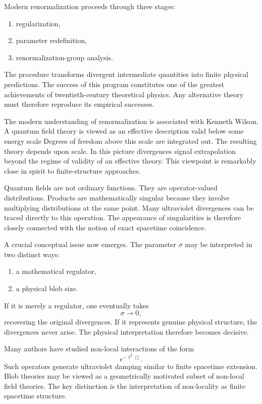 Modern renormalization proceeds through three stages:
\begin{enumerate}
\item regularization,
\item parameter redefinition,
\item renormalization-group analysis.
\end{enumerate}
The procedure transforms divergent intermediate quantities into finite physical predictions.
The success of this program constitutes one of the greatest achievements of twentieth-century theoretical physics.
Any alternative theory must therefore reproduce its empirical successes.

The modern understanding of renormalization is associated with
Kenneth Wilson.
A quantum field theory is viewed as an effective description valid below some energy scale
Degrees of freedom above this scale are integrated out.
The resulting theory depends upon scale.
In this picture divergences signal extrapolation beyond the regime of validity of an effective theory.
This viewpoint is remarkably close in spirit to finite-structure approaches.

Quantum fields are not ordinary functions.
They are operator-valued distributions.
Products 
are mathematically singular because they involve multiplying distributions at the same point.
Many ultraviolet divergences can be traced directly to this operation.
The appearance of singularities is therefore closely connected with the notion of exact spacetime coincidence.

A crucial conceptual issue now emerges.
The parameter $\sigma $
may be interpreted in two distinct ways:
\begin{enumerate}
\item a mathematical regulator,
\item a physical blob size.
\end{enumerate}
If it is merely a regulator, one eventually takes
\[
\sigma\rightarrow 0,
\]
recovering the original divergences.
If it represents genuine physical structure, the divergences never arise.
The physical interpretation therefore becomes decisive.

Many authors have studied non-local interactions of the form
\[
e^{-\ell^2\Box}.
\]
Such operators generate ultraviolet damping similar to finite spacetime extension.
Blob theories may be viewed as a geometrically motivated subset of
non-local field theories.
The key distinction is the interpretation of non-locality as finite 
spacetime structure.

